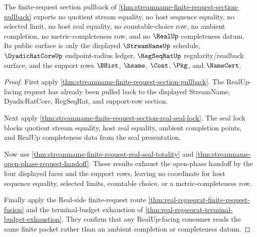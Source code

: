 \begin{theorem}
\label{thm:streamname-finite-request-section-nonescape}
The finite-request section pullback of
\autoref{thm:streamname-finite-request-section-pullback} exports no quotient
stream equality, no host sequence equality, no selected limit, no host real
equality, no countable-choice row, no ambient completion, no
metric-completeness row, and no $\RealUp$ completeness datum. Its public
surface is only the displayed $\StreamNameUp$ schedule, $\DyadicRatCoreUp$
endpoint-radius ledger, $\RegSeqRatUp$ regularity/readback surface, and the
support rows $\BHist$, $\hsame$, $\Cont$, $\Pkg$, and $\NameCert$.
\end{theorem}
\begin{proof}
First apply \autoref{thm:streamname-finite-request-section-pullback}. The
RealUp-facing request has already been pulled back to the displayed
StreamName, DyadicRatCore, RegSeqRat, and support-row section.

Next apply \autoref{thm:streamname-finite-request-section-real-seal-lock}. The
seal lock blocks quotient stream equality, host real equality, ambient
completion points, and RealUp completeness data from the seal presentation.

Now use \autoref{thm:streamname-finite-request-real-seal-totality} and
\autoref{thm:streamname-open-phase-request-handoff}. These results exhaust the
open-phase handoff by the four displayed faces and the support rows, leaving no
coordinate for host sequence equality, selected limits, countable choice, or a
metric-completeness row.

Finally apply the Real-side finite-request route
\autoref{thm:real-regseqrat-finite-request-fusion} and the terminal-budget
exhaustion of \autoref{thm:real-regseqrat-terminal-budget-exhaustion}. They
confirm that any RealUp-facing consumer reads the same finite packet rather
than an ambient completion or completeness datum.
\end{proof}

